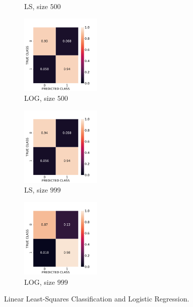 \documentclass[12pt, a4 paper]{article}
\begin{document}
\begin{figure}[!htbp]
\begin{subfigure}[!htbp]{0.2\textwidth}
       \caption{LS, size $500$}
       \label{fig:LS_P1a_500}
    \end{subfigure}
\quad
    \begin{subfigure}[!htbp]{0.2\textwidth}
       \centering
       \includegraphics[width=1.5in]{../results/ex1/acc_LOG_dataset_Normal_size_500.pdf}
       \caption{LOG, size $500$}
       \label{fig:LOG_P1a_500}
    \end{subfigure}
\quad   
    \begin{subfigure}[!htbp]{0.2\textwidth}
       \centering
       \includegraphics[width=1.5in]{../results/ex1/acc_LS_dataset_Normal_size_999.pdf}
       \caption{LS, size $999$}
       \label{fig:LS_P1a_999}
    \end{subfigure}
\quad
    \begin{subfigure}[!htbp]{0.2\textwidth}
       \centering
       \includegraphics[width=1.5in]{../results/ex1/acc_LOG_dataset_Normal_size_999.pdf}
       \caption{LOG, size $999$}
       \label{fig:LOG_P1a_999}
    \end{subfigure}

\caption{Linear Least-Squares Classification and Logistic Regression.}
\label{fig:ex1_P1a}
\end{figure}

\end{document}

